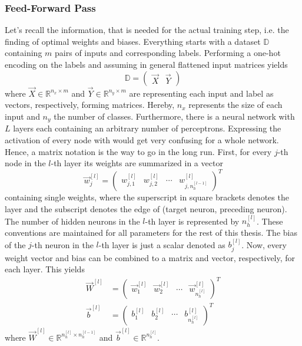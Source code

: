 \subsubsection{Feed-Forward Pass}
\label{sec:training-forward-pass}
Let's recall the information, that is needed for the actual training step, i.e. the finding of optimal weights and biases.
Everything starts with a dataset $\mathbb{D}$ containing $m$ pairs of inputs and corresponding labels.
Performing a one-hot encoding on the labels and assuming in general flattened input matrices yields
\begin{equation}
	\label{eq:dataset-one-hot}
	\mathbb{D} =
	\begin{pmatrix}
		\vec{X} & \vec{Y}
	\end{pmatrix}
\end{equation}
where $\vec{X} \in \mathbb{R}^{n_x \times m}$ and $\vec{Y} \in \mathbb{R}^{n_y \times m}$ are representing each input and label as vectors, respectively, forming matrices.
Hereby, $n_x$ represents the size of each input and $n_y$ the number of classes.
Furthermore, there is a neural network with $L$ layers each containing an arbitrary number of perceptrons.
Expressing the activation of every node with  would get very confusing for a whole network.
Hence, a matrix notation is the way to go in the long run.
First, for every $j$-th node in the $l$-th layer its weights are summarized in a vector
\begin{equation}
	\label{eq:weights-vector}
	\vec{w}^{[l]}_j =
	\begin{pmatrix}
		w^{[l]}_{j,1} & w^{[l]}_{j,2} & \cdots & w^{[l]}_{j,n^{[l-1]}_h}
	\end{pmatrix}^T
\end{equation}
containing single weights, where the superscript in square brackets denotes the layer and the subscript denotes the edge of (target neuron, preceding neuron).
The number of hidden neurons in the $l$-th layer is represented by $n^{[l]}_h$.
These conventions are maintained for all parameters for the rest of this thesis.
The bias of the $j$-th neuron in the $l$-th layer is just a scalar denoted as $b^{[l]}_j$. 
Now, every weight vector and bias can be combined to a matrix and vector, respectively, for each layer.
This yields
\begin{subequations}
\label{eq:parameters}
	\begin{align}
		\vec{W}^{[l]} &=
		\begin{pmatrix}
			\vec{w}^{[l]}_1 & \vec{w}^{[l]}_2 & \cdots & \vec{w}^{[l]}_{n^{[l]}_h}
		\end{pmatrix}^T
		\label{eq:weights}
		\\
		\vec{b}^{[l]} &=
			\begin{pmatrix}
				b^{[l]}_1 & b^{[l]}_2 & \cdots & b^{[l]}_{n^{[l]}_h}
			\end{pmatrix}^T
		\label{eq:biases}
	\end{align}
\end{subequations}
where $\vec{W}^{[l]} \in \mathbb{R}^{n^{[l]}_h \times n^{[l-1]}_h}$ and $\vec{b}^{[l]} \in \mathbb{R}^{n^{[l]}_h}$.

